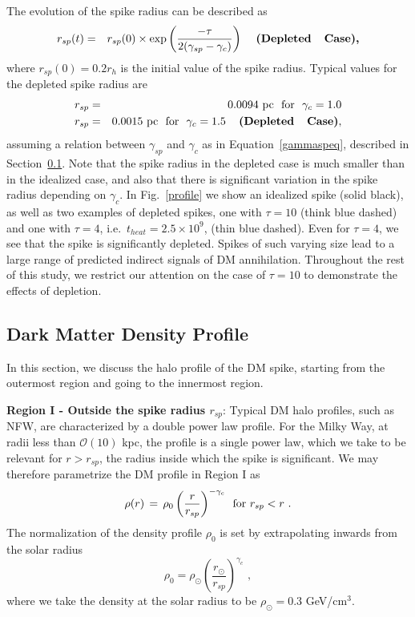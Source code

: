 \documentclass[11pt]{article}
\newcommand{\be}{\begin{equation}}
\newcommand{\ee}{\end{equation}}
\newcommand{\bea}{\begin{eqnarray}}
\newcommand{\eea}{\end{eqnarray}}
\begin{document}
The evolution of the spike radius can be described as~\cite{Ahn:2007ty}
%
\bea 
\label{depletion}
r_{sp}(t) &=& r_{sp}(0) \times \exp \left( \frac{-\tau}{2(\gamma_{sp} - \gamma_c)} \right) \,\,\,\,\,\,\, \textbf{(Depleted \,\, Case),} 
\eea
%
where $r_{sp}(0)=0.2r_h$ is the initial value of the spike radius.  Typical values for the depleted spike radius are
%
\bea
r_{sp} & = & 0.0094 \,\,{\rm pc} \,\,\,\,{\rm for } \,\,\,\, \gamma_c = 1.0   \nonumber \\
r_{sp} & = & 0.0015 \,\,{\rm pc} \,\,\,\,{\rm for } \,\,\,\, \gamma_c = 1.5\,\,\,\,\,\,\,\textbf{(Depleted \,\, Case)},
\eea
%
assuming a relation between $\gamma_{sp}$ and $\gamma_c$ as in Equation~\ref{gammaspeq}, described in Section~\ref{sec:spikeprofile}.
Note that the spike radius in the depleted case is much smaller than in the idealized case, and also that there is significant variation in the spike radius depending on $\gamma_c$. 
In Fig.~\ref{profile} we show an idealized spike (solid black), as well as two examples of depleted spikes, one with $\tau=10$ (think blue dashed) and one with $\tau=4$, i.e.~$t_{heat}=2.5\times 10^9$, (thin blue dashed).  Even for $\tau=4$, we see that the spike is significantly depleted.
Spikes of such varying size lead to a large range of predicted indirect signals of DM annihilation.
Throughout the rest of this study, we restrict our attention on the case of $\tau=10$ to demonstrate the effects of depletion.

\subsection{Dark Matter Density Profile}
\label{sec:spikeprofile}


In this section, we discuss the halo profile of the DM spike, starting from the outermost region and going to the innermost region.

\textbf{Region I - Outside the spike radius $r_{sp}$}: Typical DM halo profiles, such as NFW, are characterized by a double power law profile.  For the Milky Way, at radii less than $\mathcal{O}(10)$ kpc, the profile is a single power law, which we take to be relevant for $r>r_{sp}$, the radius inside which the spike is significant.  We may therefore parametrize the DM profile in Region I as
%
\be
\rho (r) \, = \, \rho_0 \left(\frac{r}{r_{sp}}\right)^{-\gamma_c}\,\,\,{\rm for}\,\, r_{sp} < r \,\,.
\ee
%
The normalization of the density profile $\rho_0$ is set by extrapolating inwards from the solar radius
%
\be
\rho_0 = \rho_{\odot} \left(\frac{r_{\odot}}{r_{sp}}\right)^{\gamma_c} \,\,,
\ee
%
where we take the density at the solar radius to be $\rho_{\odot} = 0.3$ GeV/cm$^{3}$.
\end{document}
